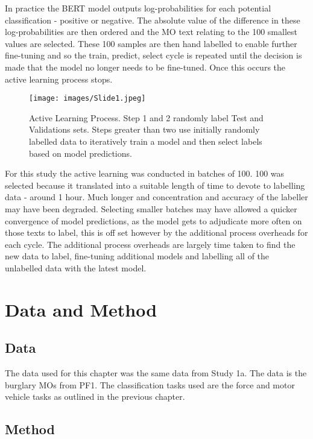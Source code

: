 In practice the BERT model outputs log-probabilities for each potential classification - positive or negative. The absolute value of the difference in these log-probabilities are then ordered and the MO text relating to the 100 smallest values are selected. These 100 samples are then hand labelled to enable further fine-tuning and so the train, predict, select cycle is repeated until the decision is made that the model no longer needs to be fine-tuned. Once this occurs the active learning process stops. 

\begin{figure}[!tbp]
  \centering
    \texttt{[image: images/Slide1.jpeg]}
    \caption[Active Learning Process.]{Active Learning Process. Step 1 and 2 randomly label Test and Validations sets. Steps greater than two use initially randomly labelled data to iteratively train a model and then select labels based on model predictions.}
    \label{fig:active_process}
\end{figure}

 For this study the active learning was conducted in batches of 100. 100 was selected because it translated into a suitable length of time to devote to labelling data - around 1 hour. Much longer and concentration and accuracy of the labeller may have been degraded. Selecting smaller batches may have allowed a quicker convergence of model predictions, as the model gets to adjudicate more often on those texts to label, this is off set however by the additional process overheads for each cycle. The additional process overheads are largely time taken to find the new data to label, fine-tuning additional models and labelling all of the unlabelled data with the latest model.
 

 
\section{Data and Method}


\subsection{Data}

The data used for this chapter was the same data from Study 1a. The data is the burglary MOs from PF1. The classification tasks used are the force and motor vehicle tasks as outlined in the previous chapter.

\subsection{Method}

